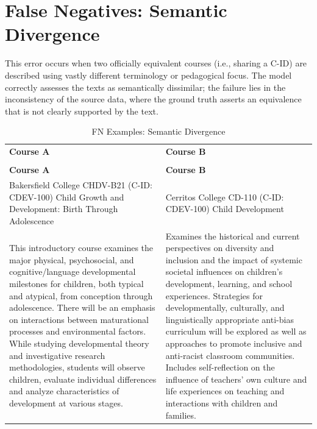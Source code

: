 \section{False Negatives: Semantic Divergence}\label{app:semdiv}
This error occurs when two officially equivalent courses (i.e., sharing a C-ID) are described using vastly different terminology or pedagogical focus. The model correctly assesses the texts as semantically dissimilar; the failure lies in the inconsistency of the source data, where the ground truth asserts an equivalence that is not clearly supported by the text.

{
\renewcommand{\arraystretch}{0.5}    
\begin{longtable}{ >{\baselineskip=12pt}p{}  >{\baselineskip=12pt}p{} }
\captionsetup{skip=5pt}
\caption{FN Examples: Semantic Divergence}\label{tab:fn_divergence}\\
\bottomrule\toprule
\textbf{\textbf{Course A}} & \textbf{Course B} \\
\bottomrule\toprule
\endfirsthead
\caption[]{FN Examples: Semantic Divergence}\\
\bottomrule\toprule
\textbf{\textbf{Course A}} & \textbf{Course B} \\
\bottomrule\toprule
\endhead
Bakersfield College \newline CHDV-B21 (C-ID: CDEV-100) \newline Child Growth and Development: Birth Through Adolescence & Cerritos College \newline CD-110 (C-ID: CDEV-100) \newline Child Development \\
\midrule
This introductory course examines the major physical, psychosocial, and cognitive/language developmental milestones for children, both typical and atypical, from conception through adolescence. There will be an emphasis on interactions between maturational processes and environmental factors. While studying developmental theory and investigative research methodologies, students will observe children, evaluate individual differences and analyze characteristics of development at various stages. & Examines the historical and current perspectives on diversity and inclusion and the impact of systemic societal influences on children’s development, learning, and school experiences. Strategies for developmentally, culturally, and linguistically appropriate anti-bias curriculum will be explored as well as approaches to promote inclusive and anti-racist classroom communities. Includes self-reflection on the influence of teachers’ own culture and life experiences on teaching and interactions with children and families. \\

\end{longtable}}
